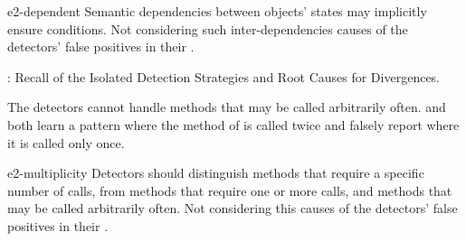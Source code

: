 \begin{obs}{e2-dependent}
  Semantic dependencies between objects' states may implicitly ensure conditions.
  Not considering such inter-dependencies causes  of the detectors' false positives in their .
\end{obs}

\begin{table*}[tb]
  \centering
  \small
	\caption{: Recall of the Isolated Detection Strategies and Root Causes for Divergences.}
    
  \label{tab:ex1-results}
\end{table*}


\vspace{0.03in}
The detectors cannot handle methods that may be called arbitrarily often.
\GROUMiner and \Jadet both learn a pattern where the  method of  is called twice and falsely report  where it is called only once.

\begin{obs}{e2-multiplicity}
  Detectors should distinguish methods that require a specific number of calls, from methods that require one or more calls, and methods that may be called arbitrarily often.
  Not considering this causes  of the detectors' false positives in their .
\end{obs}

